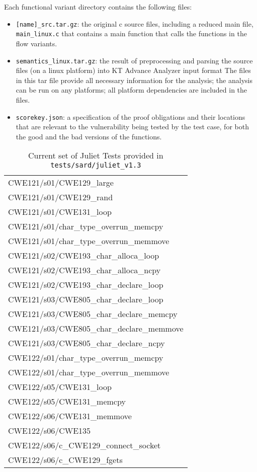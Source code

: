 \documentclass[11pt]{article}
\begin{document}
Each functional variant directory contains the following files:
\begin{itemize}[leftmargin=*]
\item {\tt [name]\_src.tar.gz}: the original c source files, including a reduced main file,
{\tt main\_linux.c} that contains a main function that calls the functions in
the flow variants.
\item {\tt semantics\_linux.tar.gz}: the result of preprocessing and parsing the source 
  files (on a linux platform) into KT Advance Analyzer input format
  The files in this tar file provide all necessary information for the analysis; 
  the analysis can be run on any platforms; all platform dependencies are included 
  in the files.
\item {\tt scorekey.json}: a specification of the proof obligations and their locations
  that are relevant to the vulnerability being tested by the test case, for both the
  good and the bad versions of the functions.
\end{itemize}

\begin{table}
\centering
\begin{tabular}{|l|}  \hline
  CWE121/s01/CWE129\_large  \\                
  CWE121/s01/CWE129\_rand  \\                 
  CWE121/s01/CWE131\_loop   \\                 
  CWE121/s01/char\_type\_overrun\_memcpy  \\    
  CWE121/s01/char\_type\_overrun\_memmove \\   
  CWE121/s02/CWE193\_char\_alloca\_loop  \\    
  CWE121/s02/CWE193\_char\_alloca\_ncpy  \\    
  CWE121/s02/CWE193\_char\_declare\_loop  \\   
  CWE121/s03/CWE805\_char\_declare\_loop  \\   
  CWE121/s03/CWE805\_char\_declare\_memcpy \\  
  CWE121/s03/CWE805\_char\_declare\_memmove  \\
  CWE121/s03/CWE805\_char\_declare\_ncpy  \\   
  CWE122/s01/char\_type\_overrun\_memcpy \\    
  CWE122/s01/char\_type\_overrun\_memmove \\   
  CWE122/s05/CWE131\_loop \\                 
  CWE122/s05/CWE131\_memcpy \\               
  CWE122/s06/CWE131\_memmove \\              
  CWE122/s06/CWE135  \\                     
  CWE122/s06/c\_CWE129\_connect\_socket \\     
  CWE122/s06/c\_CWE129\_fgets \\ \hline             
\end{tabular}
\caption{\label{tab:juliet} Current set of Juliet Tests provided in {\tt tests/sard/juliet\_v1.3}}
\end{table}
\end{document}
